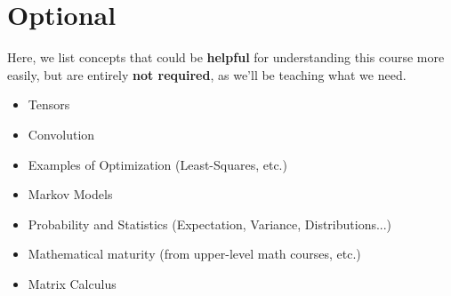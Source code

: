     
\section{Optional}

    Here, we list concepts that could be \textbf{helpful} for understanding this course more easily, but are entirely \textbf{not required}, as we'll be teaching what we need.
    
    \begin{itemize}
        \item Tensors
        \item Convolution
        \item Examples of Optimization (Least-Squares, etc.)
        \item Markov Models
        \item Probability and Statistics (Expectation, Variance, Distributions...)
        \item Mathematical maturity (from upper-level math courses, etc.)
        \item Matrix Calculus
    \end{itemize}